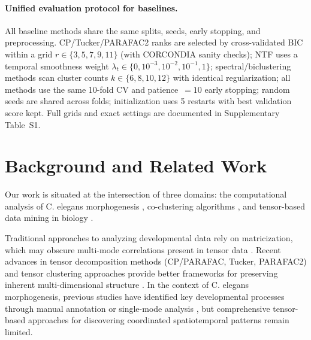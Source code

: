 \documentclass[unnumsec,webpdf,modern,large,namedate]{oup-authoring-template}%
\theoremstyle{thmstyleone}\newtheorem{theorem}{Theorem}
\theoremstyle{thmstyletwo}\newtheorem{example}{Example}
\theoremstyle{thmstylethree}\newtheorem{definition}{Definition}
\begin{document}
\paragraph{Unified evaluation protocol for baselines.} All baseline methods share the same splits, seeds, early stopping, and preprocessing. CP/Tucker/PARAFAC2 ranks are selected by cross-validated BIC within a grid $r\in\{3,5,7,9,11\}$ (with CORCONDIA sanity checks); NTF uses a temporal smoothness weight $\lambda_t\in\{0,10^{-3},10^{-2},10^{-1},1\}$; spectral/biclustering methods scan cluster counts $k\in\{6,8,10,12\}$ with identical regularization; all methods use the same 10-fold CV and patience~$=10$ early stopping; random seeds are shared across folds; initialization uses 5 restarts with best validation score kept. Full grids and exact settings are documented in Supplementary Table~S1.

\section{Background and Related Work}

Our work is situated at the intersection of three domains: the computational analysis of C. elegans morphogenesis \citep{sulston1983EmbryonicCellLineage,bao2006AutomatedCellLineage,murray2008AutomatedAnalysisEmbryonic,chisholm2005epidermal,kaletta2006FindingFunctionNovel}, co-clustering algorithms \citep{hartigan1972DirectClusteringData,madeira2004BiclusteringAlgorithmsBiological,xie2019ItTimeApplya,hochreiter2010FABIAFactorAnalysis,orzechowski2018EBICEvolutionarybasedParallel,yi2021COBRACFastImplementation}, and tensor-based data mining in biology \citep{kolda2009TensorDecompositionsApplications,cichocki2015TensorDecompositionsSignal,sidiropoulos2017TensorDecompositionSignal,drakopoulos2019TensorClusteringReview,sun2008IncrementalTensorAnalysis,cheng2019TensorBasedLowDimensionalRepresentation}.

Traditional approaches to analyzing developmental data rely on matricization, which may obscure multi-mode correlations present in tensor data \citep{kolda2009TensorDecompositionsApplications,cichocki2015TensorDecompositionsSignal}. Recent advances in tensor decomposition methods (CP/PARAFAC, Tucker, PARAFAC2) and tensor clustering approaches provide better frameworks for preserving inherent multi-dimensional structure \citep{sidiropoulos2017TensorDecompositionSignal,drakopoulos2019TensorClusteringReview}. In the context of C. elegans morphogenesis, previous studies have identified key developmental processes through manual annotation or single-mode analysis \citep{sulston1983EmbryonicCellLineage,bao2006AutomatedCellLineage,murray2008AutomatedAnalysisEmbryonic,zhu2024TIAM1RegulatesPolarized}, but comprehensive tensor-based approaches for discovering coordinated spatiotemporal patterns remain limited.
\end{document}

